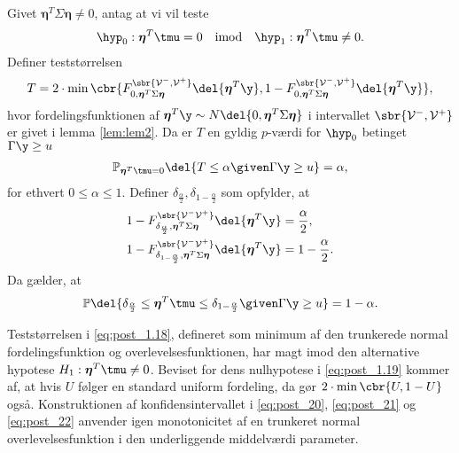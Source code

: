 \begin{lem} \label{lem:lem4}
Givet \(\boldsymbol{\eta}^T \Sigma \boldsymbol{\eta} \neq 0\), antag at vi vil teste
\begin{align*}
\hyp_0: \boldsymbol{\eta}^T \tmu=0 \quad \text{imod} \quad \hyp_1: \boldsymbol{\eta}^T \tmu \neq 0.
\end{align*}
Definer teststørrelsen
\begin{align}
T=2 \cdot \min\cbr{F_{0, \boldsymbol{\eta}^T \Sigma \boldsymbol{\eta}}^{\sbr{\mathcal{V}^-, \mathcal{V}^+}} \del{\boldsymbol{\eta}^T \y}, 1 - F_{0, \boldsymbol{\eta}^T \Sigma \boldsymbol{\eta}}^{\sbr{\mathcal{V}^-, \mathcal{V}^+}} \del{\boldsymbol{\eta}^T \y}}, \label{eq:post_1.18}
\end{align}
hvor fordelingsfunktionen af \(\boldsymbol{\eta}^T \y \sim N \del{0,  \boldsymbol{\eta}^T \Sigma \boldsymbol{\eta}}\) i intervallet \(\sbr{\mathcal{V}^-, \mathcal{V}^+}\) er givet i lemma \ref{lem:lem2}.
Da er \(T\) en gyldig \(p\)-værdi for \(\hyp_0\) betinget \(\Gamma \y \geq u\)
\begin{align}
\mathbb{P}_{\boldsymbol{\eta}^T \tmu=0} \del{T \leq \alpha \given \Gamma \y \geq u} = \alpha, \label{eq:post_1.19}
\end{align}
for ethvert \(0 \leq \alpha \leq 1\). 
Definer \(\delta_{\frac{\alpha}{2}}, \delta_{1-\frac{\alpha}{2}}\) som opfylder, at
\begin{align}
1-F_{\delta_{\frac{\alpha}{2}}, \boldsymbol{\eta}^T \Sigma \boldsymbol{\eta}}^{\sbr{\mathcal{V}^- \mathcal{V}^+}} \del{\boldsymbol{\eta}^T \y} &= \frac{\alpha}{2}, \label{eq:post_20} \\
1-F_{\delta_{1-\frac{\alpha}{2}}, \boldsymbol{\eta}^T \Sigma \boldsymbol{\eta} }^{\sbr{\mathcal{V}^- \mathcal{V}^+}} \del{\boldsymbol{\eta}^T \y} &= 1-\frac{\alpha}{2}. \label{eq:post_21}
\end{align}
Da gælder, at
\begin{align}
\mathbb{P} \del{\delta_{\frac{\alpha}{2}} \leq  \boldsymbol{\eta}^T \tmu \leq \delta_{1-\frac{\alpha}{2}} \given \Gamma \y \geq u} = 1- \alpha. \label{eq:post_22}
\end{align}
\end{lem}
%
Teststørrelsen i \eqref{eq:post_1.18}, defineret som minimum af den trunkerede normal fordelingsfunktion og overlevelsesfunktionen, har magt imod den alternative hypotese \(H_1: \boldsymbol{\eta}^T \tmu \neq 0\).
Beviset for dens nulhypotese i \eqref{eq:post_1.19} kommer af, at hvis \(U\) følger en standard uniform fordeling, da gør \(2 \cdot \min \cbr{U,1-U}\) også.
Konstruktionen af konfidensintervallet i \eqref{eq:post_20}, \eqref{eq:post_21} og \eqref{eq:post_22} anvender igen monotonicitet af en trunkeret normal overlevelsesfunktion i den underliggende middelværdi parameter.


